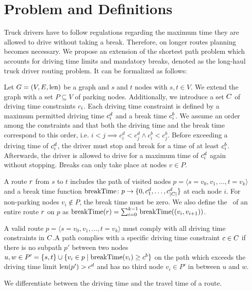 \chapter{Problem and Definitions}\label{chapter:problem_definitions}
Truck drivers have to follow regulations regarding the maximum time they are allowed to drive without taking a break. Therefore, on longer routes planning becomes necessary. We propose an extension of the shortest path problem which accounts for driving time limits and mandatory breaks, denoted as the long-haul truck driver routing problem. It can be formalized as follows:

Let $G=(V,E,\operatorname{len})$ be a graph and $s$ and $t$ nodes with $s,t \in V$. We extend the graph with a set $P \subseteq V$ of parking nodes. Additionally, we introduce a set $C$ of driving time constraints $c_i$. Each driving time constraint is defined by a maximum permitted driving time $c_i^d$ and a break time $c_i^b$. We assume an order among the constraints and that both the driving time and the break time correspond to this order, i.e. $i<j \implies c_i^d < c_j^d \wedge c_i^b < c_j^b$. Before exceeding a driving time of $c_i^d$, the driver must stop and break for a time of at least $c_i^b$. Afterwards, the driver is allowed to drive for a maximum time of $c_i^d$ again without stopping. Breaks can only take place at nodes $v \in P$.

A route $r$ from $s$ to $t$ includes the path of visited nodes $p = \langle s=v_0,v_1,\dots,t=v_k \rangle$ and a break time function $\operatorname{breakTime}\colon p \rightarrow \{0,c_1^d,\dots,c_{|C|}^d\}$ at each node $i$. For non-parking nodes $v_i \notin P$, the break time must be zero. We also define the \breakTime\ of an entire route $r$ on $p$ as $\operatorname{breakTime}(r) = \sum_{i=0}^{k-1}{\operatorname{breakTime}((v_i,v_{i+1}))}$.

\begin{definition}
	A valid route $p = \langle s=v_0,v_1,...,t=v_k \rangle$ must comply with all driving time constraints in $C$.A path complies with a specific driving time constraint $c \in C$ if there is no subpath $p'$ between two nodes $u,w \in P' = \{s,t\} \cup \{v_i \in p \mid \operatorname{breakTime}(v_i) \ge c^b\}$ on the path which exceeds the driving time limit $\operatorname{len}(p') > c^d$ and has no third node $v_i \in P'$ in between $u$ and $w$.
\end{definition}

We differentiate between the driving time and the travel time of a route.

